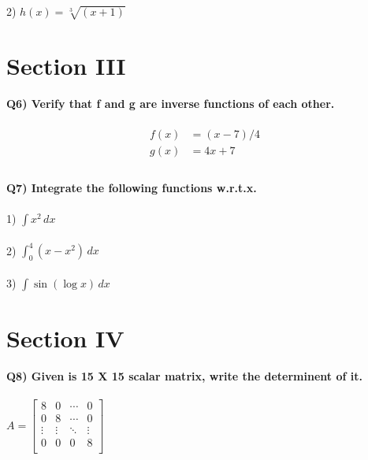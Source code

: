 \documentclass[12pt]{article}
\begin{document}
2) $ h(x) = 
\sqrt[3]{(x+1)}
$ 




\section*{Section III}
\textbf{Q6) Verify that f and g are inverse functions of each other.\\\\}
\begin{align*}
f(x) &= (x-7)/4 \\
g(x) &= 4x+7 \\
\end{align*}
\\
\textbf{Q7) Integrate the following functions w.r.t.x.\\\\}
1) $\int x^2\, dx $ \\\\
2) $\int_{0}^{4} (x-x^2)\, dx $ \\\\
3) $\int \sin{(\log{x})} \, dx $ \\




\section*{Section IV}
\textbf{Q8) Given is 15 X 15 scalar matrix, write the determinent of it.\\\\}
$ A = 
\begin{bmatrix}
8 & 0 & \cdots & 0 \\
0 & 8 & \cdots & 0 \\
\vdots & \vdots & \ddots  & \vdots \\
0 & 0 & 0 & 8 \\
\end{bmatrix}
$
\end{document}
